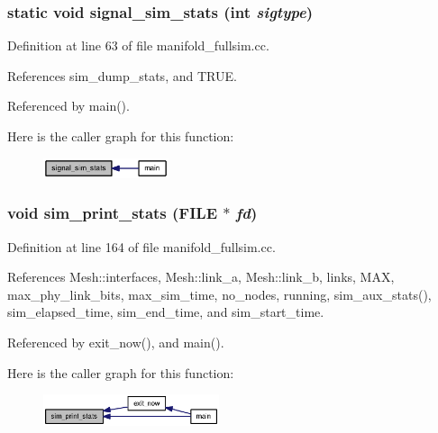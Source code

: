 \subsubsection[{signal\_\-sim\_\-stats}]{\setlength{\rightskip}{0pt plus 5cm}static void signal\_\-sim\_\-stats (int {\em sigtype})\hspace{0.3cm}{\tt  [static]}}\label{manifold__fullsim_8cc_206bcb38d2bf43a4c9e8e82d038f1643}




Definition at line 63 of file manifold\_\-fullsim.cc.

References sim\_\-dump\_\-stats, and TRUE.

Referenced by main().

Here is the caller graph for this function:\nopagebreak
\begin{figure}[H]
\begin{center}
\leavevmode
\includegraphics[width=104pt]{manifold__fullsim_8cc_206bcb38d2bf43a4c9e8e82d038f1643_icgraph}
\end{center}
\end{figure}
\subsubsection[{sim\_\-print\_\-stats}]{\setlength{\rightskip}{0pt plus 5cm}void sim\_\-print\_\-stats (FILE $\ast$ {\em fd})}\label{manifold__fullsim_8cc_ebded8bcfea50ac2770a680b87509424}




Definition at line 164 of file manifold\_\-fullsim.cc.

References Mesh::interfaces, Mesh::link\_\-a, Mesh::link\_\-b, links, MAX, max\_\-phy\_\-link\_\-bits, max\_\-sim\_\-time, no\_\-nodes, running, sim\_\-aux\_\-stats(), sim\_\-elapsed\_\-time, sim\_\-end\_\-time, and sim\_\-start\_\-time.

Referenced by exit\_\-now(), and main().

Here is the caller graph for this function:\nopagebreak
\begin{figure}[H]
\begin{center}
\leavevmode
\includegraphics[width=146pt]{manifold__fullsim_8cc_ebded8bcfea50ac2770a680b87509424_icgraph}
\end{center}
\end{figure}

